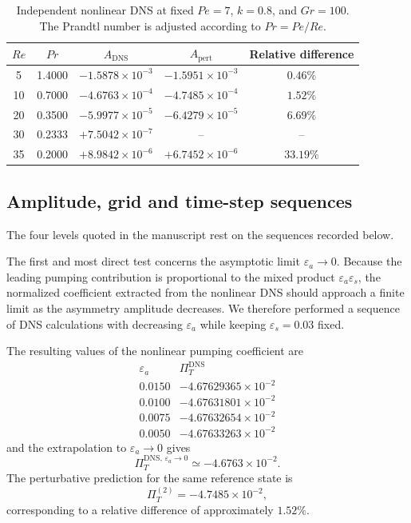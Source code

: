 \documentclass[12pt,a4paper]{article}
\newcommand{\Rey}{\mathit{Re}}
\newcommand{\Pe}{\mathit{Pe}}
\newcommand{\Grr}{\mathit{Gr}}
\renewcommand{\Pr}{\mathit{Pr}}
\newcommand{\PiT}{\Pi_T}
\newenvironment{ruledtabular}{}{}
\begin{document}
\begin{table}[htb]
\centering
\caption{
Independent nonlinear DNS at fixed $\Pe=7$, $k=0.8$, and $\Grr=100$.
The Prandtl number is adjusted according to $\Pr=\Pe/\Rey$.
}
\label{tab:dns_re_sweep}
\begin{ruledtabular}
\begin{tabular}{ccccc}
$\Rey$ & $\Pr$ & $A_{\mathrm{DNS}}$ & $A_{\mathrm{pert}}$ & Relative difference \\
\hline
5
& 1.4000
& $-1.5878\times10^{-3}$
& $-1.5951\times10^{-3}$
& $0.46\%$ \\
10
& 0.7000
& $-4.6763\times10^{-4}$
& $-4.7485\times10^{-4}$
& $1.52\%$ \\
20
& 0.3500
& $-5.9977\times10^{-5}$
& $-6.4279\times10^{-5}$
& $6.69\%$ \\
30
& 0.2333
& $+7.5042\times10^{-7}$
& --
& -- \\
35
& 0.2000
& $+8.9842\times10^{-6}$
& $+6.7452\times10^{-6}$
& $33.19\%$ \\
\end{tabular}
\end{ruledtabular}
\end{table}


\subsection{Amplitude, grid and time-step sequences}
\label{subsec:dns_sequences}

The four levels quoted in the manuscript rest on the sequences recorded below.


The first and most direct test concerns the asymptotic limit
$\varepsilon_a\rightarrow0$. Because the leading pumping contribution is
proportional to the mixed product $\varepsilon_a\varepsilon_s$, the
normalized coefficient extracted from the nonlinear DNS should approach a
finite limit as the asymmetry amplitude decreases. We therefore performed a
sequence of DNS calculations with decreasing $\varepsilon_a$ while keeping
$\varepsilon_s=0.03$ fixed.

The resulting values of the nonlinear pumping coefficient are
\begin{equation}
\begin{array}{c|c}
\varepsilon_a & \PiT^{\mathrm{DNS}}\\
\hline
0.0150 & -4.67629365\times10^{-2}\\
0.0100 & -4.67631801\times10^{-2}\\
0.0075 & -4.67632654\times10^{-2}\\
0.0050 & -4.67633263\times10^{-2}
\end{array}
\end{equation}
and the extrapolation to $\varepsilon_a\rightarrow0$ gives
\begin{equation}
\PiT^{\mathrm{DNS},\,\varepsilon_a\rightarrow0}
\simeq -4.6763\times10^{-2}.
\end{equation}
The perturbative prediction for the same reference state is
\begin{equation}
\PiT^{(2)} = -4.7485\times10^{-2},
\end{equation}
corresponding to a relative difference of approximately
$1.52\%$.
\end{document}
